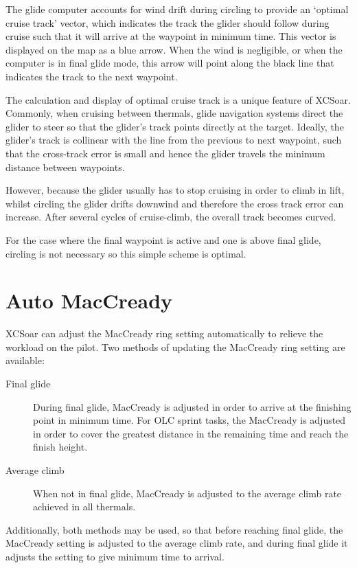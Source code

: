 \documentclass[a4paper,12pt]{refrep}
\begin{document}
The glide computer accounts for wind drift during circling to provide
an `optimal cruise track' vector, which indicates the track the glider
should follow during cruise such that it will arrive at the waypoint
in minimum time.  This vector is displayed on the map as a blue arrow.
When the wind is negligible, or when the computer is in final glide
mode, this arrow will point along the black line that indicates the
track to the next waypoint.

The calculation and display of optimal cruise track is a unique
feature of XCSoar.  Commonly, when cruising between thermals, glide
navigation systems direct the glider to steer so that the glider's
track points directly at the target.  Ideally, the glider's track is
collinear with the line from the previous to next waypoint, such that
the cross-track error is small and hence the glider travels the
minimum distance between waypoints.

However, because the glider usually has to stop cruising in order to
climb in lift, whilst circling the glider drifts downwind and
therefore the cross track error can increase.  After several cycles of
cruise-climb, the overall track becomes curved.
%

For the case where the final waypoint is active and one is above final
glide, circling is not necessary so this simple scheme is optimal.

\section{Auto MacCready}\label{sec:auto-maccready}

XCSoar can adjust the MacCready ring setting automatically to relieve the
workload on the pilot.  Two methods of updating the MacCready ring setting
are available:
\begin{description}
\item[Final glide]  During final glide, MacCready is adjusted in order to
 arrive at the finishing point in minimum time.  For OLC sprint tasks,
 the MacCready is adjusted in order to cover the greatest distance in the remaining
 time and reach the finish height.
\item[Average climb] When not in final glide, MacCready is adjusted
to the average climb rate achieved in all thermals.
\end{description}
Additionally, both methods may be used, so that before reaching final glide,
the MacCready setting is adjusted to the average climb rate, and during final
glide it adjusts the setting to give minimum time to arrival.
\end{document}
